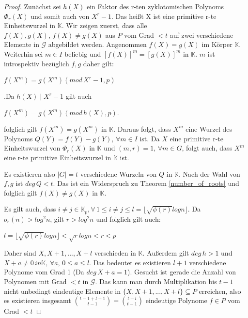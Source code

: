 \documentclass[12pt,oneside]{article}
\theoremstyle{remark}
\theoremstyle{definition}
\begin{document}
\begin{proof}
Zunächst sei $h(X)$ ein Faktor des r-ten zyklotomischen Polynoms $\Phi_r (X)$ und somit auch von $X^r - 1$. Das heißt X ist eine primitive r-te Einheitswurzel in $\mathbb{K}$. Wir zeigen zuerst, dass alle $f(X),g(X), \, f(X) \neq g(X)$ aus $P$ vom Grad $ < t$ auf zwei verschiedene Elemente in $\mathcal{G}$ abgebildet werden.\newline\newline
Angenommen $f(X) = g(X)$ im Körper $\mathbb{K}$. Weiterhin sei $m \in I$ beliebig und $[f(X)]^m = [g(X)]^m$ in $\mathbb{K}$. $m$ ist introspektiv bezüglich $f, g$ daher gilt:\newline\newline
\centerline{$f(X^m) = g(X^m) (mod \, X^r - 1,p)$}.\newline\newline Da $h(X) \mid X^r - 1$ gilt auch\newline\newline
\centerline{$f(X^m) = g(X^m) (mod \, h(X),p)$.}\newline



folglich gilt $f(X^m) = g(X^m)$ in $\mathbb{K}$. Daraus folgt, dass $X^m$ eine Wurzel des Polynoms $Q(Y) = f(Y) - g(Y), \, \forall m \in I$ ist. Da $X$ eine primitive r-te Einheitswurzel von $\Phi_r(X)$ in $\mathbb{K}$ und $(m,r) = 1, \, \forall m \in G$, folgt auch, dass $X^m$ eine r-te primitive Einheitswurzel in $\mathbb{K}$ ist.

Es existieren also $|G| = t$ verschiedene Wurzeln von $Q$ in $\mathbb{K}$. Nach der Wahl von $f,g$ ist $deg \, Q < t$. Das ist ein Widerspruch zu Theorem \ref{number_of_roots} und folglich gilt $f(X) \neq g(X)$ in $\mathbb{K}$.

Es gilt auch, dass $i \neq j  \in \mathbb{K}_p, \forall \, 1 \leq i \neq j \leq l = \lfloor \sqrt{\phi(r)} log n \rfloor$. Da $o_r(n) > log^2 n$, gilt $r > log^2 n$ und folglich gilt auch:\newline\newline
\centerline{$l = \lfloor \sqrt{\phi(r)} log n \rfloor < \sqrt{r} log n < r < p$}

Daher sind $X, X + 1, ..., X + l$ verschieden in $\mathbb{K}$. Außerdem gilt $deg \, h > 1$ und $X + a \neq 0 \, in \mathbb{K}, \, \forall a, \, 0 \leq a \leq l $. Das bedeutet es existieren $l + 1$ verschiedene Polynome vom Grad 1 (Da $deg \, X + a = 1$). Gesucht ist gerade die Anzahl von Polynomen mit Grad $ < t $ in $\mathcal{G}$. Das kann man durch Multiplikation bis $t - 1$ nicht unbedingt eindeutige Elemente in $\{ X, X + 1, ..., X+ l\} \subseteq P$ erreichen, also es existieren insgesamt ${t - 1 + l +1 \choose t - 1} = {t + l \choose t - 1}$ eindeutige Polynome $f \in P$ vom Grad $ < t$
\end{proof}
\end{document}
